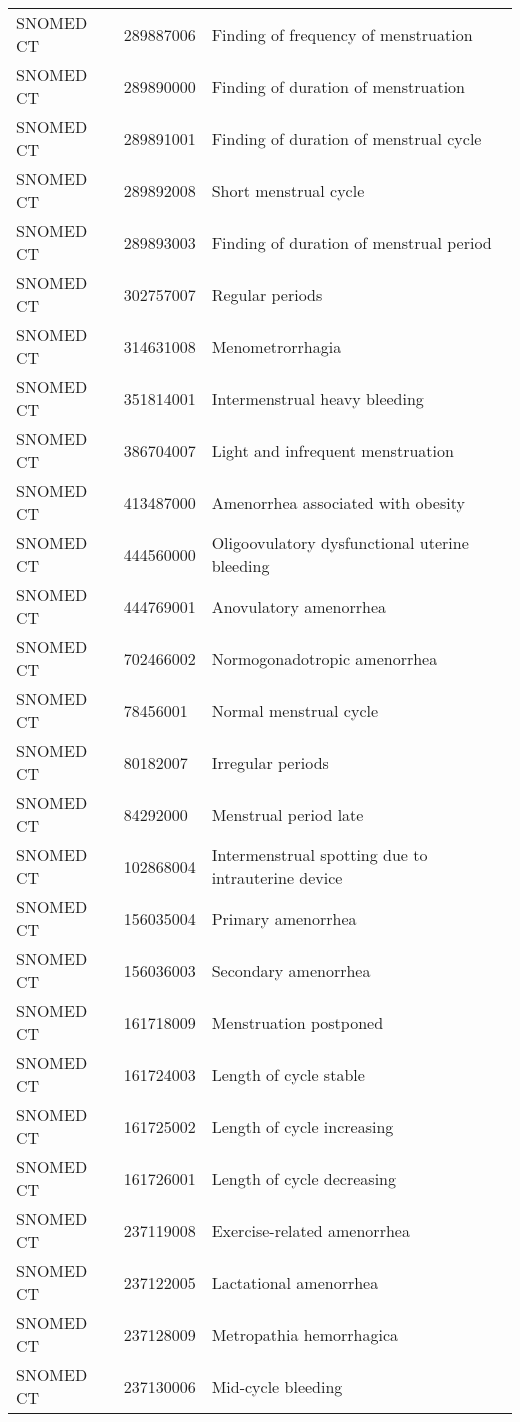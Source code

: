 \begin{longtable}{p{}p{}p{}}
  SNOMED CT & 289887006 & Finding of frequency of menstruation \\ 
  SNOMED CT & 289890000 & Finding of duration of menstruation \\ 
  SNOMED CT & 289891001 & Finding of duration of menstrual cycle \\ 
  SNOMED CT & 289892008 & Short menstrual cycle \\ 
  SNOMED CT & 289893003 & Finding of duration of menstrual period \\ 
  SNOMED CT & 302757007 & Regular periods \\ 
  SNOMED CT & 314631008 & Menometrorrhagia \\ 
  SNOMED CT & 351814001 & Intermenstrual heavy bleeding \\ 
  SNOMED CT & 386704007 & Light and infrequent menstruation \\ 
  SNOMED CT & 413487000 & Amenorrhea associated with obesity \\ 
  SNOMED CT & 444560000 & Oligoovulatory dysfunctional uterine bleeding \\ 
  SNOMED CT & 444769001 & Anovulatory amenorrhea \\ 
  SNOMED CT & 702466002 & Normogonadotropic amenorrhea \\ 
  SNOMED CT & 78456001 & Normal menstrual cycle \\ 
  SNOMED CT & 80182007 & Irregular periods \\ 
  SNOMED CT & 84292000 & Menstrual period late \\ 
  SNOMED CT & 102868004 & Intermenstrual spotting due to intrauterine device \\ 
  SNOMED CT & 156035004 & Primary amenorrhea \\ 
  SNOMED CT & 156036003 & Secondary amenorrhea \\ 
  SNOMED CT & 161718009 & Menstruation postponed \\ 
  SNOMED CT & 161724003 & Length of cycle stable \\ 
  SNOMED CT & 161725002 & Length of cycle increasing \\ 
  SNOMED CT & 161726001 & Length of cycle decreasing \\ 
  SNOMED CT & 237119008 & Exercise-related amenorrhea \\ 
  SNOMED CT & 237122005 & Lactational amenorrhea \\ 
  SNOMED CT & 237128009 & Metropathia hemorrhagica \\ 
  SNOMED CT & 237130006 & Mid-cycle bleeding \\ 

\end{longtable}
